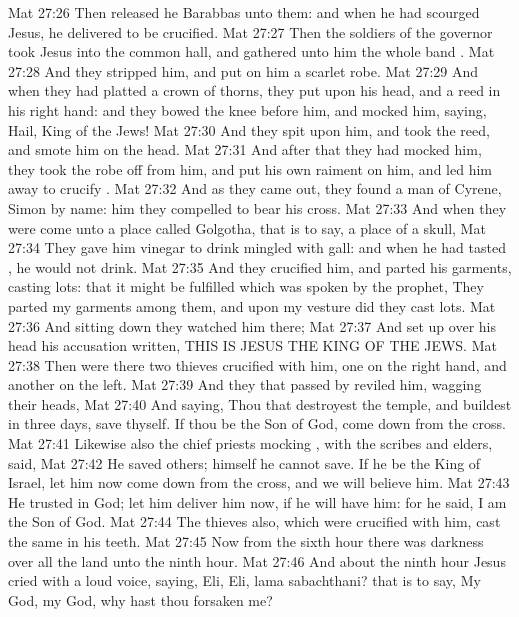 \vs Mat 27:26 Then released he Barabbas unto them: and when he had scourged Jesus, he delivered  to be crucified.
\vs Mat 27:27 Then the soldiers of the governor took Jesus into the common hall, and gathered unto him the whole band .
\vs Mat 27:28 And they stripped him, and put on him a scarlet robe.
\vs Mat 27:29 And when they had platted a crown of thorns, they put  upon his head, and a reed in his right hand: and they bowed the knee before him, and mocked him, saying, Hail, King of the Jews!
\vs Mat 27:30 And they spit upon him, and took the reed, and smote him on the head.
\vs Mat 27:31 And after that they had mocked him, they took the robe off from him, and put his own raiment on him, and led him away to crucify .
\vs Mat 27:32 And as they came out, they found a man of Cyrene, Simon by name: him they compelled to bear his cross.
\vs Mat 27:33 And when they were come unto a place called Golgotha, that is to say, a place of a skull,
\vs Mat 27:34 They gave him vinegar to drink mingled with gall: and when he had tasted , he would not drink.
\vs Mat 27:35 And they crucified him, and parted his garments, casting lots: that it might be fulfilled which was spoken by the prophet, They parted my garments among them, and upon my vesture did they cast lots.
\vs Mat 27:36 And sitting down they watched him there;
\vs Mat 27:37 And set up over his head his accusation written, THIS IS JESUS THE KING OF THE JEWS.
\vs Mat 27:38 Then were there two thieves crucified with him, one on the right hand, and another on the left.
\vs Mat 27:39 And they that passed by reviled him, wagging their heads,
\vs Mat 27:40 And saying, Thou that destroyest the temple, and buildest  in three days, save thyself. If thou be the Son of God, come down from the cross.
\vs Mat 27:41 Likewise also the chief priests mocking , with the scribes and elders, said,
\vs Mat 27:42 He saved others; himself he cannot save. If he be the King of Israel, let him now come down from the cross, and we will believe him.
\vs Mat 27:43 He trusted in God; let him deliver him now, if he will have him: for he said, I am the Son of God.
\vs Mat 27:44 The thieves also, which were crucified with him, cast the same in his teeth.
\vs Mat 27:45 Now from the sixth hour there was darkness over all the land unto the ninth hour.
\vs Mat 27:46 And about the ninth hour Jesus cried with a loud voice, saying, Eli, Eli, lama sabachthani? that is to say, My God, my God, why hast thou forsaken me?
